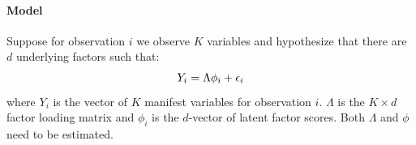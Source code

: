 \documentclass[letterpaper,10pt,english]{sphinxmanual}
\begin{document}
\paragraph{Model}
\label{zelig-factorbayes:model}
Suppose for observation \(i\) we observe \(K\) variables and
hypothesize that there are \(d\) underlying factors such that:
\begin{gather}
\begin{split}\begin{aligned}
Y_i = \Lambda \phi_i+\epsilon_i\end{aligned}\end{split}\notag
\end{gather}
where \(Y_{i}\) is the vector of \(K\) manifest variables for
observation \(i\). \(\Lambda\) is the \(K \times d\) factor
loading matrix and \(\phi_i\) is the \(d\)-vector of latent
factor scores. Both \(\Lambda\) and \(\phi\) need to be
estimated.
\end{document}
